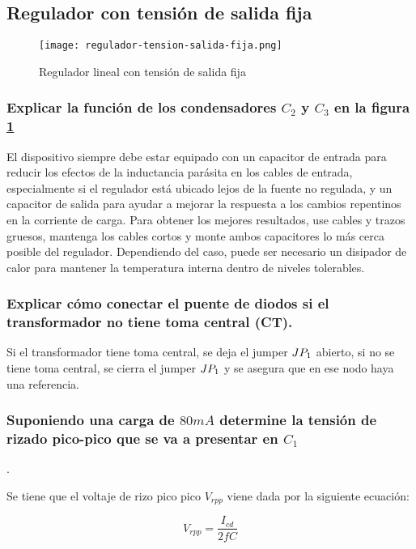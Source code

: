 \subsection{Regulador con tensión de salida fija}

\begin{figure}[ht]
    \centering
    \texttt{[image: regulador-tension-salida-fija.png]}
    \caption{Regulador lineal con tensión de salida fija}
    \label{fig:regulador-lineal-tension-fija}
\end{figure}

\subsubsection*{Explicar la función de los condensadores $C_2$ y $C_3$ en la figura \ref{fig:regulador-lineal-tension-fija}}

El dispositivo siempre debe estar equipado con un capacitor de entrada para reducir los efectos de la inductancia parásita en los cables de entrada, especialmente si el regulador está ubicado lejos de la fuente no regulada, y un capacitor de salida para ayudar a mejorar la respuesta a los cambios repentinos en la corriente de carga. Para obtener los mejores resultados, use cables y trazos gruesos, mantenga los cables cortos y monte ambos capacitores lo más cerca posible del regulador. Dependiendo del caso, puede ser necesario un disipador de calor para mantener la temperatura interna dentro de niveles tolerables.

\subsubsection*{Explicar cómo conectar el puente de diodos si el transformador no tiene toma central (CT).}

Si el transformador tiene toma central, se deja el jumper $JP_{1}$ abierto, si no se tiene toma central, se cierra el jumper $JP_{1}$ y se asegura que en ese nodo haya una referencia.

\subsubsection*{Suponiendo una carga de $80mA$ determine la tensión de rizado pico-pico que se va a presentar en $C_1$}.

Se tiene que el voltaje de rizo pico pico $V_{rpp}$ viene dada por la siguiente ecuación:

\begin{equation}
    V_{rpp} = \frac{I_{cd}}{2 f C}
\end{equation}

